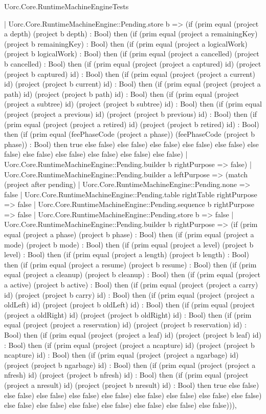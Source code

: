 \begin{lexlean}{Uorc.Core.RuntimeMachineEngineTests}
\begin{semanticmodule}
{      | Uorc.Core.RuntimeMachineEngine::Pending.store b => (if (prim equal (project a depth) (project b depth) : Bool) then (if (prim equal (project a remainingKey) (project b remainingKey) : Bool) then (if (prim equal (project a logicalWork) (project b logicalWork) : Bool) then (if (prim equal (project a cancelled) (project b cancelled) : Bool) then (if (prim equal (project (project a captured) id) (project (project b captured) id) : Bool) then (if (prim equal (project (project a current) id) (project (project b current) id) : Bool) then (if (prim equal (project (project a path) id) (project (project b path) id) : Bool) then (if (prim equal (project (project a subtree) id) (project (project b subtree) id) : Bool) then (if (prim equal (project (project a previous) id) (project (project b previous) id) : Bool) then (if (prim equal (project (project a retired) id) (project (project b retired) id) : Bool) then (if (prim equal (feePhaseCode (project a phase)) (feePhaseCode (project b phase)) : Bool) then true else false) else false) else false) else false) else false) else false) else false) else false) else false) else false) else false)
      | Uorc.Core.RuntimeMachineEngine::Pending.builder b rightPurpose => false)
    | Uorc.Core.RuntimeMachineEngine::Pending.builder a leftPurpose => (match (project after pending)
      | Uorc.Core.RuntimeMachineEngine::Pending.none => false
      | Uorc.Core.RuntimeMachineEngine::Pending.table rightTable rightPurpose => false
      | Uorc.Core.RuntimeMachineEngine::Pending.sequence b rightPurpose => false
      | Uorc.Core.RuntimeMachineEngine::Pending.store b => false
      | Uorc.Core.RuntimeMachineEngine::Pending.builder b rightPurpose => (if (prim equal (project a phase) (project b phase) : Bool) then (if (prim equal (project a mode) (project b mode) : Bool) then (if (prim equal (project a level) (project b level) : Bool) then (if (prim equal (project a length) (project b length) : Bool) then (if (prim equal (project a resume) (project b resume) : Bool) then (if (prim equal (project a cleanup) (project b cleanup) : Bool) then (if (prim equal (project a active) (project b active) : Bool) then (if (prim equal (project (project a carry) id) (project (project b carry) id) : Bool) then (if (prim equal (project (project a oldLeft) id) (project (project b oldLeft) id) : Bool) then (if (prim equal (project (project a oldRight) id) (project (project b oldRight) id) : Bool) then (if (prim equal (project (project a reservation) id) (project (project b reservation) id) : Bool) then (if (prim equal (project (project a leaf) id) (project (project b leaf) id) : Bool) then (if (prim equal (project (project a ncapture) id) (project (project b ncapture) id) : Bool) then (if (prim equal (project (project a ngarbage) id) (project (project b ngarbage) id) : Bool) then (if (prim equal (project (project a nfresh) id) (project (project b nfresh) id) : Bool) then (if (prim equal (project (project a nresult) id) (project (project b nresult) id) : Bool) then true else false) else false) else false) else false) else false) else false) else false) else false) else false) else false) else false) else false) else false) else false) else false) else false))),
}
\end{semanticmodule}
\end{lexlean}

